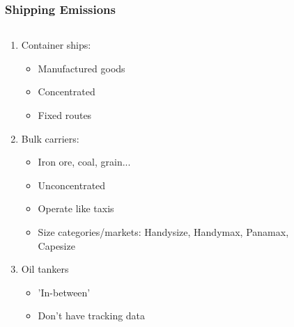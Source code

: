 \documentclass{beamer}
\begin{document}
\begin{frame}
\frametitle{Shipping Emissions}
\begin{columns}
	\begin{column}{0.5\textwidth}
        \begin{enumerate}
        \setlength{\itemsep}{0.9\baselineskip}
            \item Container ships:
            \begin{itemize}
                \item Manufactured goods
                \item Concentrated
                \item Fixed routes
            \end{itemize}
            \item Bulk carriers:
            \begin{itemize}
                \item Iron ore, coal, grain...
                \item Unconcentrated
                \item Operate like taxis
                \item Size categories/markets: Handysize, Handymax, Panamax, Capesize
            \end{itemize}
            \item \color{gray}Oil tankers
            \begin{itemize}
                \item 'In-between'
                \item Don't have tracking data
            \end{itemize}
        \end{enumerate}
	\end{column}
	\begin{column}{0.5\textwidth}
		\begin{figure}

\end{figure}
\end{column}
\end{columns}
\end{frame}
\end{document}
